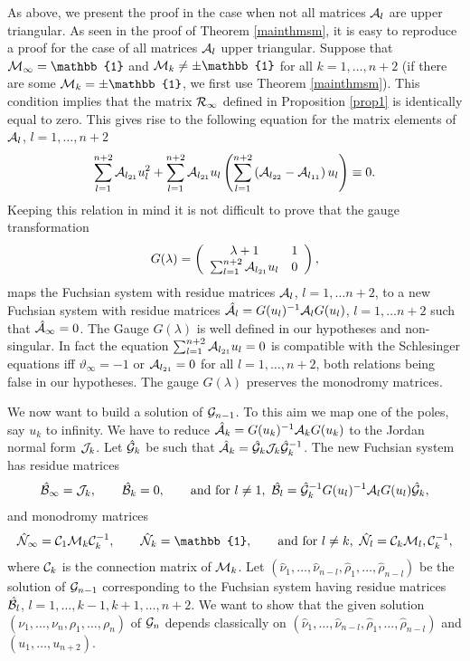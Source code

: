 \documentclass[12pt]{article}
\def\thi{{\vartheta_\infty}}
\newcommand{\ID}{\mathbb{1}}
\theoremstyle{definition}
\theoremstyle{theorem}
\begin{document}
 As above, we present the proof in 
the case when not all matrices ${\cal A}_l$ are upper triangular.
As seen in the proof of Theorem \ref{mainthmsm}, it is easy to
reproduce a proof for the case of all matrices ${\cal A}_l$ 
upper triangular. Suppose that ${\cal M}_\infty=\ID$ and 
${\cal M}_k\neq\pm\ID$ for all $k=1,\dots,n+2$ (if there are some 
${\cal M}_k=\pm\ID$, we first use Theorem \ref{mainthmsm}).
This condition implies that the matrix ${\cal R}_\infty$ defined 
in Proposition \ref{prop1} is identically equal to zero. This gives 
rise to the following equation for the matrix elements of 
${\cal A}_l$, $l=1,\dots,n+2$
$$
\sum_{l=1}^{n+2}{\cal A}_{l_{21}} u_l^2+
\sum_{l=1}^{n+2}{\cal A}_{l_{21}} u_l\left(
\sum_{l=1}^{n+2}\left({\cal A}_{l_{22}}-
{\cal A}_{l_{11}}\right) u_l\right)\equiv 0.
$$
Keeping this relation in mind it is not difficult to prove that
the gauge transformation
$$
G(\lambda)=\left(\begin{array}{cc}
\lambda+1 & 1\\
\sum_{l=1}^{n+2}{\cal A}_{l_{21}} u_l &0\\
\end{array}\right),
$$
maps the Fuchsian system with residue matrices ${\cal A}_l$, 
$l=1,\dots n+2$, to a new Fuchsian system with residue matrices 
$\hat{\cal A}_l=G(u_l)^{-1} {\cal A}_l G(u_l)$, $l=1,\dots n+2$
such that $\hat{\cal A}_\infty=0$. The Gauge $G(\lambda)$ is well 
defined in our hypotheses and non-singular. In fact the equation 
$\sum_{l=1}^{n+2}{\cal A}_{l_{21}} u_l=0$ is compatible with
the Schlesinger equations iff $\thi=-1$ or ${\cal A}_{l_{21}}=0$ for 
all $l=1,\dots,n+2$, both relations being false in our hypotheses.
The gauge $G(\lambda)$ preserves the monodromy matrices.

We now want to build a solution of ${\cal G}_{n-1}$. To this aim we
map one of the poles, say $u_k$ to infinity. We have 
to reduce $\hat{\cal A}_k= G(u_k)^{-1} {\cal A}_k G(u_k)$ to the
Jordan normal form ${\cal J}_k$. Let $\hat{\cal G}_k$ be such 
that $\hat{\cal A}_k=\hat{\cal G}_k{\cal J}_k\hat{\cal G}_k^{-1}$.
The new Fuchsian system has residue matrices
$$
\hat{\cal B}_\infty={\cal J}_k,\qquad
\hat{\cal B}_k= 0,\qquad 
\hbox{and for $l\neq 1$, }\,
\hat{\cal B}_l= \hat{\cal G}_k^{-1} G(u_l)^{-1} 
{\cal A}_l  G(u_l) \hat{\cal G}_k,
$$
and monodromy matrices
$$
\hat{\cal N}_\infty={\cal C}_1{\cal M}_k{\cal C}_k^{-1},\qquad
\hat{\cal  N}_k=\ID,\qquad
\hbox{and for $l\neq k$, }\,
\hat{\cal N}_l= {\cal C}_k{\cal M}_l,{\cal C}_k^{-1},
$$
where ${\cal C}_k$ is the connection matrix of ${\cal M}_k$.
Let $(\hat\nu_1,\dots,\hat\nu_{n-l},\hat\rho_1,
\dots,\hat\rho_{n-l})$ be the solution of ${\cal G}_{n-1}$
corresponding to the Fuchsian system having residue matrices
$\hat{\cal B}_l$, $l=1,\dots,k-1,k+1,\dots,n+2$.
We want to show that the given solution
$(\nu_1,\dots,\nu_n,\rho_1,\dots,\rho_n)$ of ${\cal G}_n$
depends classically on $(\hat\nu_1,\dots,\hat\nu_{n-l},\hat\rho_1,
\dots,\hat\rho_{n-l})$ and $(u_1,\dots,u_{n+2})$.
\end{document}
